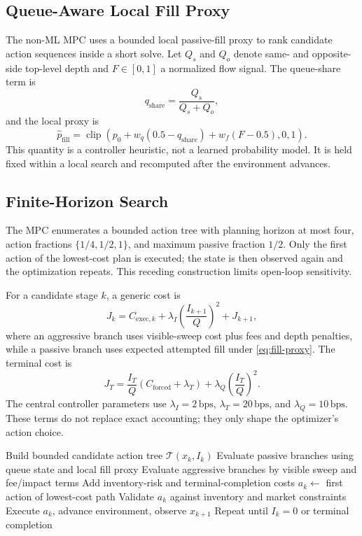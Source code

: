 \documentclass[journal,10pt]{IEEEtran}
\newcommand{\bps}{\ensuremath{\,\mathrm{bps}}}
\newcommand{\1}{\mathbf{1}}
\newcommand{\clip}{\operatorname{clip}}
\begin{document}
\subsection{Queue-Aware Local Fill Proxy}
The non-ML MPC uses a bounded local passive-fill proxy to rank candidate action sequences inside a short solve. Let $Q_s$ and $Q_o$ denote same- and opposite-side top-level depth and $F\in[0,1]$ a normalized flow signal. The queue-share term is
\begin{equation}
q_{\mathrm{share}}=\frac{Q_s}{Q_s+Q_o},
\end{equation}
and the local proxy is
\begin{equation}
\hat p_{\mathrm{fill}} = \clip\left(p_0+w_q(0.5-q_{\mathrm{share}})+w_f(F-0.5),0,1\right).
\label{eq:fill-proxy}
\end{equation}
This quantity is a controller heuristic, not a learned probability model. It is held fixed within a local search and recomputed after the environment advances.

\subsection{Finite-Horizon Search}
The MPC enumerates a bounded action tree with planning horizon at most four, action fractions $\{1/4,1/2,1\}$, and maximum passive fraction $1/2$. Only the first action of the lowest-cost plan is executed; the state is then observed again and the optimization repeats. This receding construction limits open-loop sensitivity.

For a candidate stage $k$, a generic cost is
\begin{equation}
J_k = C_{\mathrm{exec},k} + \lambda_I \left(\frac{I_{k+1}}{Q}\right)^2 + J_{k+1},
\end{equation}
where an aggressive branch uses visible-sweep cost plus fees and depth penalties, while a passive branch uses expected attempted fill under \cref{eq:fill-proxy}. The terminal cost is
\begin{equation}
J_T = \frac{I_T}{Q}\left(C_{\mathrm{forced}}+\lambda_T\right)
+\lambda_Q\left(\frac{I_T}{Q}\right)^2.
\label{eq:terminal}
\end{equation}
The central controller parameters use $\lambda_I=2\bps$, $\lambda_T=20\bps$, and $\lambda_Q=10\bps$. These terms do not replace exact accounting; they only shape the optimizer's action choice.

\begin{algorithm}[t]
\caption{Receding-Horizon Execution Control}
\label{alg:mpc}
\DontPrintSemicolon
{}
Build bounded candidate action tree $\mathcal{T}(x_k,I_k)$\;
Evaluate passive branches using queue state and local fill proxy\;
Evaluate aggressive branches by visible sweep and fee/impact terms\;
Add inventory-risk and terminal-completion costs\;
$a_k \leftarrow$ first action of lowest-cost path\;
Validate $a_k$ against inventory and market constraints\;
Execute $a_k$, advance environment, observe $x_{k+1}$\;
Repeat until $I_k=0$ or terminal completion\;
\end{algorithm}
\end{document}
